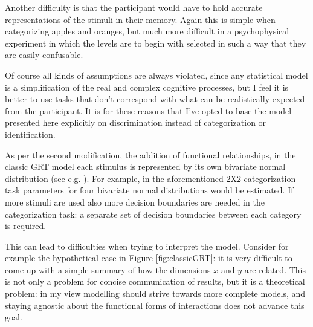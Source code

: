 \documentclass{article}\usepackage{knitr}
\begin{document}
Another difficulty is that the participant would have to hold accurate representations of the stimuli in their memory. Again this is simple when categorizing apples and oranges, but much more difficult in a psychophysical experiment in which the levels are to begin with selected in such a way that they are easily confusable. 

Of course all kinds of assumptions are always violated, since any statistical model is a simplification of the real and complex cognitive processes, but I feel it is better to use tasks that don't correspond with what can be realistically expected from the participant. It is for these reasons that I've opted to base the model presented here explicitly on discrimination instead of categorization or identification.

As per the second modification, the addition of functional relationships, in the classic GRT model each stimulus is represented by its own bivariate  normal distribution (see e.g. \cite{ashby2015}). For example, in the aforementioned 2X2 categorization task parameters for four bivariate normal distributions would be estimated. If more stimuli are used also more decision boundaries are needed in the categorization task: a separate set of decision boundaries between each category is required. 

This can lead to difficulties when trying to interpret the model. Consider for example the hypothetical case in Figure \ref{fig:classicGRT}: it is very difficult to come up with a simple summary of how the dimensions $x$ and $y$ are related. This is not only a problem for concise communication of results, but it is a theoretical problem: in my view modelling should strive towards more complete models, and staying agnostic about the functional forms of interactions does not advance this goal. 
\end{document}
